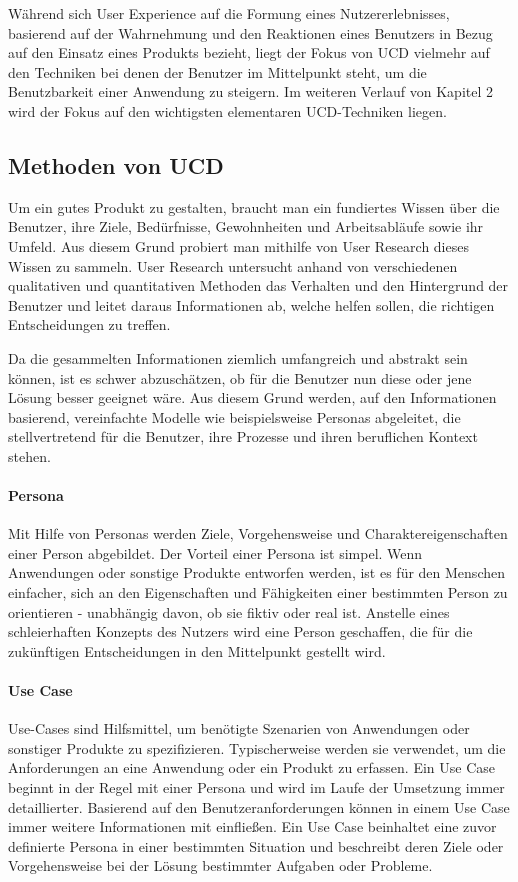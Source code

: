 Während sich User Experience auf die Formung eines Nutzererlebnisses, basierend auf der Wahrnehmung und den Reaktionen eines Benutzers in Bezug auf den Einsatz eines Produkts bezieht, liegt der Fokus von \ac{UCD} vielmehr auf den Techniken bei denen der Benutzer im Mittelpunkt steht, um die Benutzbarkeit einer Anwendung zu steigern. Im weiteren Verlauf von Kapitel 2 wird der Fokus auf den wichtigsten elementaren \ac{UCD}-Techniken liegen.

\subsection{Methoden von \acl{UCD}}

Um ein gutes Produkt zu gestalten, braucht man ein fundiertes Wissen über die Benutzer, ihre Ziele, Bedürfnisse, Gewohnheiten und Arbeitsabläufe sowie ihr Umfeld. Aus diesem Grund probiert man mithilfe von User Research dieses Wissen zu sammeln. User Research untersucht anhand von verschiedenen qualitativen und quantitativen Methoden das Verhalten und den Hintergrund der Benutzer und leitet daraus Informationen ab, welche helfen sollen, die richtigen Entscheidungen zu treffen. 
\autocite{Moser.2012}

Da die gesammelten Informationen ziemlich umfangreich und abstrakt sein können, ist es schwer abzuschätzen, ob für die Benutzer nun diese oder jene Lösung besser geeignet wäre. Aus diesem Grund werden, auf den Informationen basierend, vereinfachte Modelle wie beispielsweise Personas abgeleitet, die stellvertretend für die Benutzer, ihre Prozesse und ihren beruflichen Kontext stehen. 
\autocite{Quirmbach.}

\paragraph{Persona}
Mit Hilfe von Personas werden Ziele, Vorgehensweise und Charaktereigenschaften einer Person abgebildet. Der Vorteil einer Persona ist simpel. Wenn Anwendungen oder sonstige Produkte entworfen werden, ist es für den Menschen einfacher, sich an den Eigenschaften und Fähigkeiten einer bestimmten Person zu orientieren - unabhängig davon, ob sie fiktiv oder real ist. Anstelle eines schleierhaften Konzepts des Nutzers wird eine Person geschaffen, die für die zukünftigen Entscheidungen in den Mittelpunkt gestellt wird. \autocite{Moser.2012}

\paragraph{Use Case}
Use-Cases sind Hilfsmittel, um benötigte Szenarien von Anwendungen oder sonstiger Produkte zu spezifizieren. Typischerweise werden sie verwendet, um die Anforderungen an eine Anwendung oder ein Produkt zu erfassen. Ein Use Case beginnt in der Regel mit einer Persona und wird im Laufe der Umsetzung immer detaillierter. Basierend auf den Benutzeranforderungen können in einem Use Case immer weitere Informationen mit einfließen. Ein Use Case beinhaltet eine zuvor definierte Persona in einer bestimmten Situation und beschreibt deren Ziele oder Vorgehensweise bei der Lösung bestimmter Aufgaben oder Probleme. 
\autocite{Quirmbach.}

